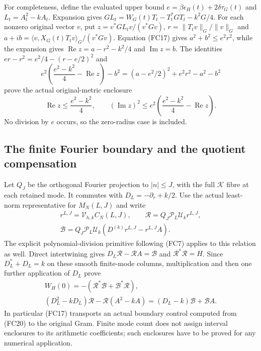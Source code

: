 For completeness, define the evaluated upper bound
$e=\beta\epsilon_H(t)+2\delta\tau_G(t)$ and $L_t=A_t^2-kA_t$.
Expansion gives $GL_t=W_G(t)T_t-T_t^*GT_t-k^2G/4$.
For each nonzero original vector $v$, put
$z=v^*GL_tv/(v^*Gv)$, $r=\|T_tv\|_G/\|v\|_G$ and
$a+ib=\langle v,X_G(t)T_tv\rangle_G/(v^*Gv)$.
Equation (FC17) gives $a^2+b^2\le e^2r^2$, while the expansion gives
$\operatorname{Re}z=a-r^2-k^2/4$ and $\operatorname{Im}z=b$.
The identities $er-r^2=e^2/4-(r-e/2)^2$ and
\[
 e^2\left(\frac{e^2-k^2}{4}-\operatorname{Re}z\right)-b^2
 =(a-e^2/2)^2+e^2r^2-a^2-b^2
\]
prove the actual original-metric enclosure
\[
 \operatorname{Re}z\le\frac{e^2-k^2}{4},\qquad
 (\operatorname{Im}z)^2\le e^2
       \left(\frac{e^2-k^2}{4}-\operatorname{Re}z\right).
 \tag{FC18}
\]
No division by $e$ occurs, so the zero-radius case is included.

\subsection{The finite Fourier boundary and the quotient compensation}

Let $Q_J$ be the orthogonal Fourier projection to $|n|\le J$, with
the full $\mathcal K$ fibre at each retained mode. It commutes with
$D_L=-\partial_r+k/2$. Use the actual least-norm representative for
$M_N(L,J)$ and write
\[
\begin{gathered}
 r^{L,J}=\mathcal V_{h,k}C_N(L,J),\qquad
 \mathscr R=Q_J\mathcal P_L\mathcal U_kr^{L,J},\\
 \mathscr B=Q_J\mathcal P_L\mathcal U_k
                (D^{(k)}r^{L,J}-r^{L,J}A).
\end{gathered}\tag{FC19}
\]
The explicit polynomial-division primitive following (FC7) applies
to this relation as well. Direct intertwining gives
$D_L\mathscr R-\mathscr RA=\mathscr B$ and $\mathscr R^*\mathscr R=H$.
Since $D_L^*+D_L=k$ on these smooth finite-mode columns, multiplication
and then one further application of $D_L$ prove
\[
\begin{gathered}
 W_H(0)=-(\mathscr R^*\mathscr B+\mathscr B^*\mathscr R),\\
 (D_L^2-kD_L)\mathscr R-\mathscr R(A^2-kA)
                    =(D_L-k)\mathscr B+\mathscr BA.
\end{gathered}\tag{FC20}
\]
In particular (FC17) transports an actual boundary control computed
from (FC20) to the original Gram. Finite mode count does not assign
interval enclosures to its arithmetic coefficients; such enclosures
have to be proved for any numerical application.

